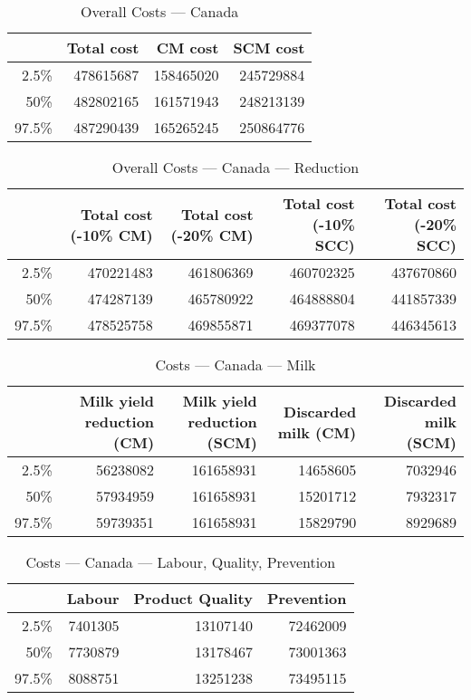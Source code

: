 \documentclass{article}\usepackage[]{graphicx}\usepackage[]{color}
\begin{document}
\begin{table}[ht]
\centering
\begin{tabular}{rrrr}
  \hline
 & Total cost & CM cost & SCM cost \\ 
  \hline
2.5\% & 478615687 & 158465020 & 245729884 \\ 
  50\% & 482802165 & 161571943 & 248213139 \\ 
  97.5\% & 487290439 & 165265245 & 250864776 \\ 
   \hline
\end{tabular}
\caption{Overall Costs --- Canada} 
\label{tab:canada:overall}
\end{table}
\begin{table}[ht]
\centering
\begin{tabular}{rrrrr}
  \hline
 & Total cost (-10\% CM) & Total cost (-20\% CM) & Total cost (-10\% SCC) & Total cost (-20\% SCC) \\ 
  \hline
2.5\% & 470221483 & 461806369 & 460702325 & 437670860 \\ 
  50\% & 474287139 & 465780922 & 464888804 & 441857339 \\ 
  97.5\% & 478525758 & 469855871 & 469377078 & 446345613 \\ 
   \hline
\end{tabular}
\caption{Overall Costs --- Canada --- Reduction} 
\label{tab:canada:reduction}
\end{table}
\begin{table}[ht]
\centering
\begin{tabular}{rrrrr}
  \hline
 & Milk yield reduction (CM) & Milk yield reduction (SCM) & Discarded milk (CM) & Discarded milk (SCM) \\ 
  \hline
2.5\% & 56238082 & 161658931 & 14658605 & 7032946 \\ 
  50\% & 57934959 & 161658931 & 15201712 & 7932317 \\ 
  97.5\% & 59739351 & 161658931 & 15829790 & 8929689 \\ 
   \hline
\end{tabular}
\caption{Costs --- Canada --- Milk} 
\label{tab:canada:a}
\end{table}
\begin{table}[ht]
\centering
\begin{tabular}{rrrr}
  \hline
 & Labour & Product Quality & Prevention \\ 
  \hline
2.5\% & 7401305 & 13107140 & 72462009 \\ 
  50\% & 7730879 & 13178467 & 73001363 \\ 
  97.5\% & 8088751 & 13251238 & 73495115 \\ 
   \hline
\end{tabular}
\caption{Costs --- Canada --- Labour, Quality, Prevention} 
\label{tab:canada:b}
\end{table}
\end{document}
